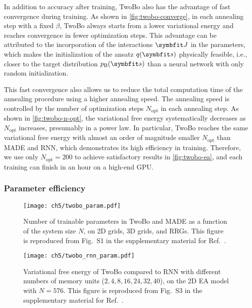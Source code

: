 In addition to accuracy after training, TwoBo also has the advantage of fast convergence during training. As shown in \cref{fig:twobo-converge}, in each annealing step with a fixed $\beta$, TwoBo always starts from a lower variational energy and reaches convergence in fewer optimization steps. This advantage can be attributed to the incorporation of the interactions $\mJ$ in the parameters, which makes the initialization of the ansatz $q(\vs)$ physically feasible, i.e., closer to the target distribution $p_\text{B}(\vs)$ than a neural network with only random initialization.

This fast convergence also allows us to reduce the total computation time of the annealing procedure using a higher annealing speed. The annealing speed is controlled by the number of optimization steps $N_\text{opt}$ in each annealing step. As shown in \cref{fig:twobo-n-opt}, the variational free energy systematically decreases as $N_\text{opt}$ increases, presumably in a power law. In particular, TwoBo reaches the same variational free energy with almost an order of magnitude smaller $N_\text{opt}$ than MADE and RNN, which demonstrates its high efficiency in training. Therefore, we use only $N_\text{opt} = 200$ to achieve satisfactory results in \cref{fig:twobo-ea}, and each training can finish in an hour on a high-end GPU.

\subsubsection{Parameter efficiency}

\begin{figure}[htb]
\centering
\texttt{[image: ch5/twobo\_param.pdf]}
\caption[Number of parameters vs.\ system size for TwoBo and MADE]{
Number of trainable parameters in TwoBo and MADE as a function of the system size $N$, on 2D grids, 3D grids, and RRGs.
This figure is reproduced from Fig.~S1 in the supplementary material for Ref.~\cite{biazzo2024sparse}.
}
\label{fig:twobo-param}
\end{figure}

\begin{figure}[htb]
\centering
\texttt{[image: ch5/twobo\_rnn\_param.pdf]}
\caption[Variational free energy vs.\ number of parameters for TwoBo and RNN]{
Variational free energy of TwoBo compared to RNN with different numbers of memory units ($2, 4, 8, 16, 24, 32, 40$), on the 2D EA model with $N = 576$.
This figure is reproduced from Fig.~S3 in the supplementary material for Ref.~\cite{biazzo2024sparse}.
}
\label{fig:twobo-rnn-param}
\end{figure}

